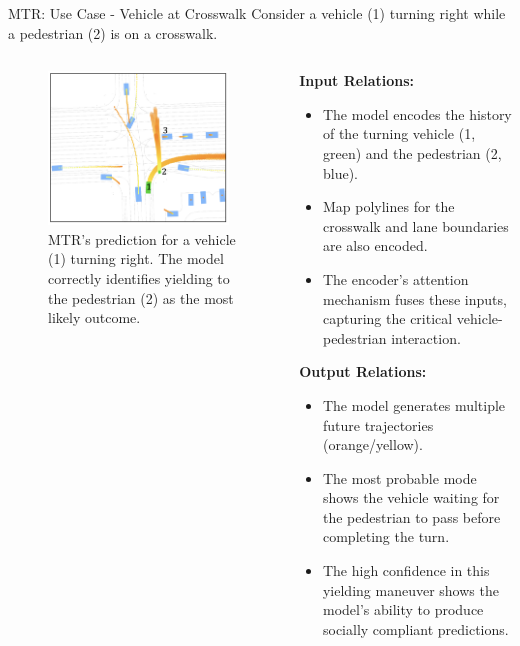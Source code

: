 \documentclass[10pt,aspectratio=169]{beamer}
\begin{document}
\begin{frame}{MTR: Use Case - Vehicle at Crosswalk}
    Consider a vehicle (1) turning right while a pedestrian (2) is on a crosswalk.
    \begin{columns}[T]
        \begin{column}{0.4\textwidth}
            \begin{figure}
                \centering
                \includegraphics[width=0.95\textwidth]{docs/latex/figures/input_output_viz_crosswalk_detail.png}
                \caption{MTR's prediction for a vehicle (1) turning right. The model correctly identifies yielding to the pedestrian (2) as the most likely outcome.}
            \end{figure}
        \end{column}
        \begin{column}{0.6\textwidth}
            \textbf{Input Relations:}
            \begin{itemize}
                \item The model encodes the history of the turning vehicle (1, green) and the pedestrian (2, blue).
                \item Map polylines for the crosswalk and lane boundaries are also encoded.
                \item The encoder's attention mechanism fuses these inputs, capturing the critical vehicle-pedestrian interaction.
            \end{itemize}
            \textbf{Output Relations:}
            \begin{itemize}
                \item The model generates multiple future trajectories (orange/yellow).
                \item The most probable mode shows the vehicle waiting for the pedestrian to pass before completing the turn.
                \item The high confidence in this yielding maneuver shows the model's ability to produce socially compliant predictions.
            \end{itemize}
        \end{column}
    \end{columns}
\end{frame}
\end{document}
